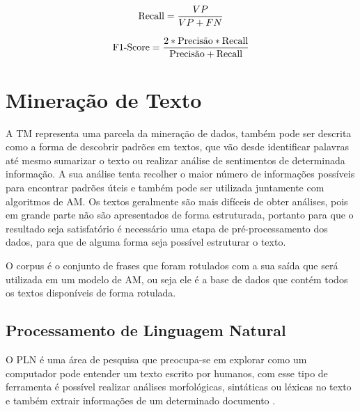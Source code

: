           \begin{equation}\label{recall}
            \begin{aligned}
              \textup{Recall} = \frac{VP}{VP+FN}
          \end{aligned} 
          \end{equation}


          \begin{equation}\label{f1score}
            \begin{aligned}
              \textup{F$1$-Score} = \frac{2*\textup{Precisão}*\textup{Recall}}{\textup{Precisão}+\textup{Recall}}
          \end{aligned} 
          \end{equation}

\section{Mineração de Texto}

          A \acrshort{TM} representa uma parcela da mineração de dados, também pode ser descrita como a forma 
        de descobrir padrões em textos, que vão desde identificar palavras até mesmo sumarizar o texto ou realizar análise de sentimentos
        de determinada informação. A sua análise tenta recolher o maior número de informações possíveis para encontrar padrões úteis e também 
        pode ser utilizada juntamente com algoritmos de \acrshort{AM}. Os textos geralmente são mais difíceis de obter análises, pois em grande
        parte não são apresentados de forma estruturada, portanto para que o resultado seja satisfatório é necessário uma etapa de pré-processamento
        dos dados, para que de alguma forma seja possível estruturar o texto.

            O corpus é o conjunto de frases que foram rotulados com a sua saída que será utilizada em um modelo de \acrshort{AM}, ou seja ele é 
        a base de dados que contém todos os textos disponíveis de forma rotulada.

  \subsection{Processamento de Linguagem Natural}

          O \acrshort{PLN} é uma área de pesquisa que preocupa-se em explorar como um computador pode entender um texto escrito por humanos, com esse tipo 
          de ferramenta é possível realizar análises morfológicas, sintáticas ou léxicas no texto e também extrair informações de um determinado
          documento \cite{liddy2001natural}. 

